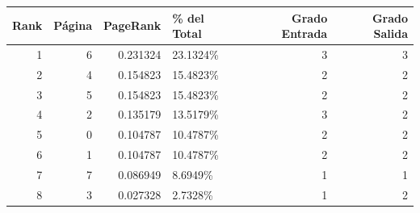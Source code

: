 \begin{tabular}{rrrlrr}
\toprule
   Rank &   Página &   PageRank & \% del Total   &   Grado Entrada &   Grado Salida \\
\midrule
      1 &        6 &   0.231324 & 23.1324\%      &               3 &              3 \\
      2 &        4 &   0.154823 & 15.4823\%      &               2 &              2 \\
      3 &        5 &   0.154823 & 15.4823\%      &               2 &              2 \\
      4 &        2 &   0.135179 & 13.5179\%      &               3 &              2 \\
      5 &        0 &   0.104787 & 10.4787\%      &               2 &              2 \\
      6 &        1 &   0.104787 & 10.4787\%      &               2 &              2 \\
      7 &        7 &   0.086949 & 8.6949\%       &               1 &              1 \\
      8 &        3 &   0.027328 & 2.7328\%       &               1 &              2 \\
\bottomrule
\end{tabular}